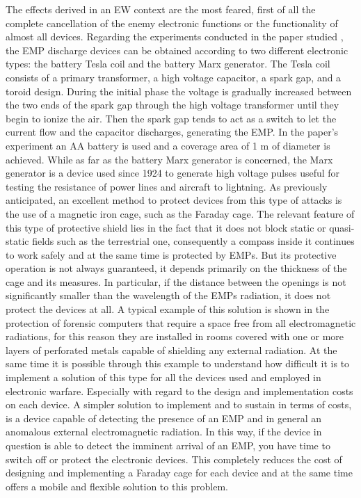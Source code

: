 \documentclass[12pt]{report}
\begin{document}
The effects derived in an EW context are the most feared, first of all the complete cancellation of the enemy electronic functions or the functionality of almost all devices. Regarding the experiments conducted in the paper studied \cite{emp1}, the EMP discharge devices can be obtained according to two different electronic types: the battery Tesla coil and the battery Marx generator. The Tesla coil consists of a primary transformer, a high voltage capacitor, a spark gap, and a toroid design. During the initial phase the voltage is gradually increased between the two ends of the spark gap through the high voltage transformer until they begin to ionize the air. Then the spark gap tends to act as a switch to let the current flow and the capacitor discharges, generating the EMP. In the paper's experiment an AA battery is used and a coverage area of 1 m of diameter is achieved. While as far as the battery Marx generator is concerned, the Marx generator is a device used since 1924 to generate high voltage pulses useful for testing the resistance of power lines and aircraft to lightning. As previously anticipated, an excellent method to protect devices from this type of attacks is the use of a magnetic iron cage, such as the Faraday cage. The relevant feature of this type of protective shield lies in the fact that it does not block static or quasi-static fields such as the terrestrial one, consequently a compass inside it continues to work safely and at the same time is protected by EMPs. But its protective operation is not always guaranteed, it depends primarily on the thickness of the cage and its measures. In particular, if the distance between the openings is not significantly smaller than the wavelength of the EMPs radiation, it does not protect the devices at all. A typical example of this solution is shown in the protection of forensic computers that require a space free from all electromagnetic radiations, for this reason they are installed in rooms covered with one or more layers of perforated metals capable of shielding any external radiation. At the same time it is possible through this example to understand how difficult it is to implement a solution of this type for all the devices used and employed in electronic warfare. Especially with regard to the design and implementation costs on each device. A simpler solution to implement and to sustain in terms of costs, is a device capable of detecting the presence of an EMP and in general an anomalous external electromagnetic radiation. In this way, if the device in question is able to detect the imminent arrival of an EMP, you have time to switch off or protect the electronic devices. This completely reduces the cost of designing and implementing a Faraday cage for each device and at the same time offers a mobile and flexible solution to this problem.
\end{document}
